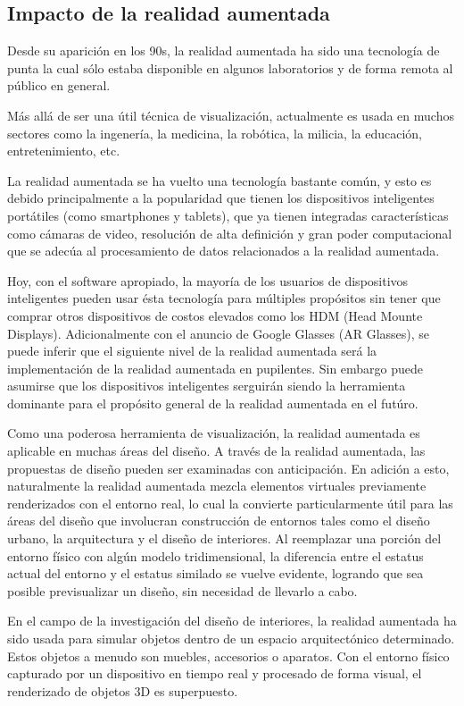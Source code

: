 \subsection{Impacto de la realidad aumentada}
Desde su aparición en los 90s, la realidad aumentada ha sido una tecnología de punta la cual sólo estaba disponible en algunos laboratorios y de forma remota al público en general. \par
Más allá de ser una útil técnica de visualización, actualmente es usada en muchos sectores como la ingenería, la medicina, la robótica, la milicia, la educación, entretenimiento, etc.\par
La realidad aumentada se ha vuelto una tecnología bastante común, y esto es debido principalmente a la popularidad que tienen los dispositivos inteligentes portátiles (como smartphones y tablets), que ya tienen integradas características como cámaras de video, resolución de alta definición y gran poder computacional que se adecúa al procesamiento de datos relacionados a la realidad aumentada.\par
Hoy, con el software apropiado, la mayoría de los usuarios de dispositivos inteligentes pueden usar ésta tecnología para múltiples propósitos sin tener que comprar otros dispositivos de costos elevados como los HDM (Head Mounte Displays). Adicionalmente con el anuncio de Google Glasses (AR Glasses), se puede inferir que el siguiente nivel de la realidad aumentada será la implementación de la realidad aumentada en pupilentes. Sin embargo puede asumirse que los dispositivos inteligentes serguirán siendo la herramienta dominante para el propósito general de la realidad aumentada en el futúro.\par
Como una poderosa herramienta de visualización, la realidad aumentada es aplicable en muchas áreas del diseño. A través de la realidad aumentada, las propuestas de diseño pueden ser examinadas con anticipación. En adición a esto, naturalmente la realidad aumentada mezcla elementos virtuales previamente renderizados con el entorno real, lo cual la convierte particularmente útil para las áreas del diseño que involucran construcción de entornos tales como el diseño urbano, la arquitectura y el diseño de interiores. Al reemplazar una porción del entorno físico con algún modelo tridimensional, la diferencia entre el estatus actual del entorno y el estatus similado se vuelve evidente, logrando que sea posible previsualizar un diseño, sin necesidad de llevarlo a cabo.\par
En el campo de la investigación del diseño de interiores, la realidad aumentada ha sido usada para simular objetos dentro de un espacio arquitectónico determinado. Estos objetos a menudo son muebles, accesorios o aparatos. Con el entorno físico capturado por un dispositivo en tiempo real y procesado de forma visual, el renderizado de objetos 3D es superpuesto.\cite{B15}

